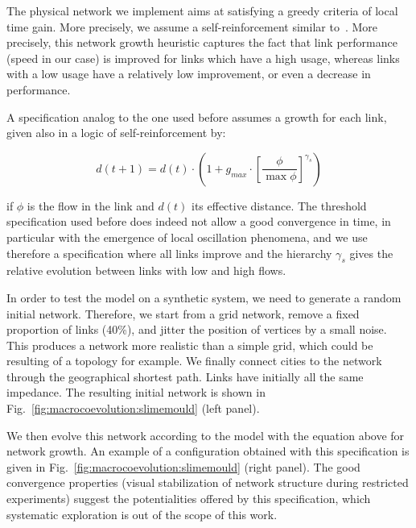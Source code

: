 \documentclass[11pt]{article}
\begin{document}
The physical network we implement aims at satisfying a greedy criteria of local time gain. More precisely, we assume a self-reinforcement similar to~\cite{tero2010rules}. More precisely, this network growth heuristic captures the fact that link performance (speed in our case) is improved for links which have a high usage, whereas links with a low usage have a relatively low improvement, or even a decrease in performance.

A specification analog to the one used before assumes a growth for each link, given also in a logic of self-reinforcement by:

\[
d(t+1) = d(t)\cdot \left(1 + g_{max} \cdot \left[\frac{\phi}{\max \phi}\right]^{\gamma_s}\right)
\]

if $\phi$ is the flow in the link and $d(t)$ its effective distance. The threshold specification used before does indeed not allow a good convergence in time, in particular with the emergence of local oscillation phenomena, and we use therefore a specification where all links improve and the hierarchy $\gamma_s$ gives the relative evolution between links with low and high flows.  


In order to test the model on a synthetic system, we need to generate a random initial network. Therefore, we start from a grid network, remove a fixed proportion of links (40\%), and jitter the position of vertices by a small noise. This produces a network more realistic than a simple grid, which could be resulting of a topology for example. We finally connect cities to the network through the geographical shortest path. Links have initially all the same impedance. The resulting initial network is shown in Fig.~\ref{fig:macrocoevolution:slimemould} (left panel).

We then evolve this network according to the model with the equation above for network growth. An example of a configuration obtained with this specification is given in Fig.~\ref{fig:macrocoevolution:slimemould} (right panel). The good convergence properties (visual stabilization of network structure during restricted experiments) suggest the potentialities offered by this specification, which systematic exploration is out of the scope of this work.
\end{document}
